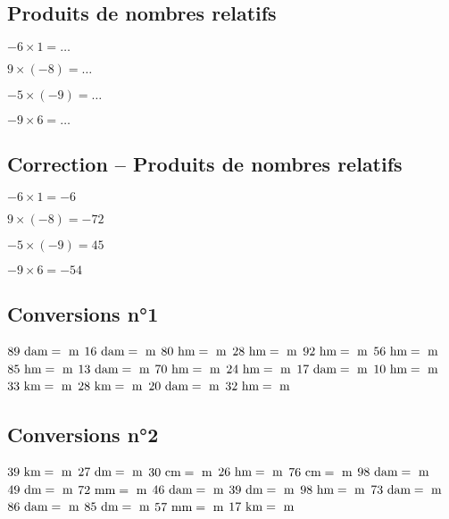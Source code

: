 \documentclass[a4paper,11pt,fleqn]{article}
\begin{document}
\subsection*{Produits de nombres relatifs}
\begin{description}

  \item $-6\times1=\ldots$
  \item $9\times(-8)=\ldots$	
  \item $-5\times(-9)=\ldots$	
  \item $-9\times6=\ldots$
\end{description}

\subsection{Correction -- Produits de nombres relatifs}
\begin{description}

  \item $-6\times1=-6$
  \item $9\times(-8)=-72$	
  \item $-5\times(-9)=45$	
  \item $-9\times6=-54$
\end{description}

\subsection*{Conversions n°1}

\begin{multicols}{4}

$89~\text{dam}=\dotfill~\text{m}$
$16~\text{dam}=\dotfill~\text{m}$
$80~\text{hm}=\dotfill~\text{m}$
$28~\text{hm}=\dotfill~\text{m}$
$92~\text{hm}=\dotfill~\text{m}$
$56~\text{hm}=\dotfill~\text{m}$
$85~\text{hm}=\dotfill~\text{m}$
$13~\text{dam}=\dotfill~\text{m}$
$70~\text{hm}=\dotfill~\text{m}$
$24~\text{hm}=\dotfill~\text{m}$
$17~\text{dam}=\dotfill~\text{m}$
$10~\text{hm}=\dotfill~\text{m}$
$33~\text{km}=\dotfill~\text{m}$
$28~\text{km}=\dotfill~\text{m}$
$20~\text{dam}=\dotfill~\text{m}$
$32~\text{hm}=\dotfill~\text{m}$
\end{multicols}

\subsection*{Conversions n°2}

\begin{multicols}{4}

$39~\text{km}=\dotfill~\text{m}$
$27~\text{dm}=\dotfill~\text{m}$
$30~\text{cm}=\dotfill~\text{m}$
$26~\text{hm}=\dotfill~\text{m}$
$76~\text{cm}=\dotfill~\text{m}$
$98~\text{dam}=\dotfill~\text{m}$
$49~\text{dm}=\dotfill~\text{m}$
$72~\text{mm}=\dotfill~\text{m}$
$46~\text{dam}=\dotfill~\text{m}$
$39~\text{dm}=\dotfill~\text{m}$
$98~\text{hm}=\dotfill~\text{m}$
$73~\text{dam}=\dotfill~\text{m}$
$86~\text{dam}=\dotfill~\text{m}$
$85~\text{dm}=\dotfill~\text{m}$
$57~\text{mm}=\dotfill~\text{m}$
$17~\text{km}=\dotfill~\text{m}$
\end{multicols}
\end{document}
